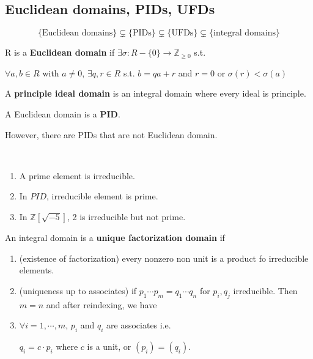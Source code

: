 \subsection{Euclidean domains, PIDs, UFDs}
\[\{\text{Euclidean domains}\}\subsetneq \{\text{PIDs}\}\subsetneq\{\text{UFDs}\}\subsetneq \{\text{integral domains}\}\]
\begin{definition}
    R is a \textbf{Euclidean domain} if  $ \exists \sigma:R-\{0\} \rightarrow \mathbb{Z} _{ \geq 0} $ s.t.
    \begin{center}
         $ \forall a,b\in R  $ with  $ a\not=0 $,  $ \exists q,r\in R  $ s.t.  $ b=qa+r $ and  $ r=0  $  or  $ \sigma(r)<\sigma(a) $
    \end{center}
\end{definition}
\begin{definition}
     A \textbf{principle ideal domain} is an integral domain where every ideal is principle.
\end{definition}
\begin{theorem}
     A Euclidean domain is a \textbf{PID}.
\end{theorem}
However, there are PIDs that are not Euclidean domain.\\
\begin{proposition}
     \,
     \begin{enumerate}
          \item A prime element is irreducible.
          \item In  $ PID $, irreducible element is prime.
          \item In  $ \mathbb{Z}[\sqrt{-5}] $, 2 is irreducible but not prime.  
     \end{enumerate}
\end{proposition}
\begin{definition}
     An integral domain is a  \textbf{unique factorization domain} if  
     \begin{enumerate}
          \item (existence of factorization) every nonzero non unit is a product fo irreducible elements.
          \item (uniqueness up to associates) if  $ p_1\cdots p_m=q_1\cdots q_n $ for  $ p_i,q_j $ irreducible. Then  $ m=n  $ and after reindexing, we have 
          \item  $ \forall i=1,\cdots,m $,  $ p_i  $ and  $ q_i  $ are associates i.e.
          \begin{center}
                $ q_i=c\cdot p_i $ where  $ c  $ is a unit, or  $ (p_i)=(q_i) $. \label{UFD uniqueness condition}
          \end{center}
     \end{enumerate}  
\end{definition}
